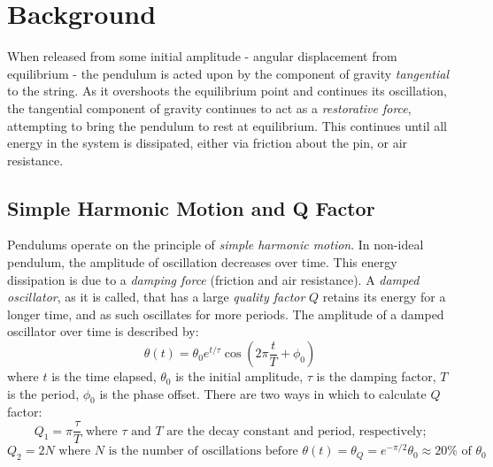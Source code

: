 \documentclass[12pt]{article}
\begin{document}
\section{Background}
\label{section:background}
When released from some initial amplitude - angular displacement from equilibrium -  
the pendulum is acted upon by the component of gravity \emph{tangential} to the string. 
As it overshoots the equilibrium point and continues its oscillation, the tangential 
component of gravity continues to act as a \emph{restorative force}, attempting to bring the 
pendulum to rest at equilibrium. This continues until all energy in the system is dissipated, either via friction about the pin, or air resistance.

\subsection{Simple Harmonic Motion and Q Factor}
\label{section:motion}
Pendulums operate on the principle of \emph{simple harmonic motion}. 
In non-ideal pendulum, the amplitude of oscillation decreases over time. This energy dissipation is due to a \emph{damping force} (friction and air resistance).
A \emph{damped oscillator}, as it is called, that has a large \emph{quality factor} $Q$ retains its energy for a longer time, and as such oscillates for more periods. The amplitude of a damped oscillator over time is described by:\\
\begin{equation}
    \label{eqn:motion}
    \theta(t) = \theta_0e^{t/\tau}\cos(2\pi\frac tT + \phi_0)
\end{equation}
\noindent
where $t$ is the time elapsed, $\theta_0$ is the initial amplitude, $\tau$ is the damping factor, $T$ is the period, $\phi_0$ is the phase offset.
There are two ways in which to calculate $Q$ factor:
\begin{equation}
    Q_1=\pi \frac \tau T \text{ where $\tau$ and $T$ are the decay constant and period, respectively;}
    \label{eqn:Q1}
\end{equation}
\begin{equation}
    Q_2=2N\text{ where $N$ is the number of oscillations before }\theta(t)=\theta_Q=e^{-\pi/2}\theta_0 \approx 20\%\text{ of }\theta_0
    \label{eqn:Q2}
\end{equation}
\end{document}
